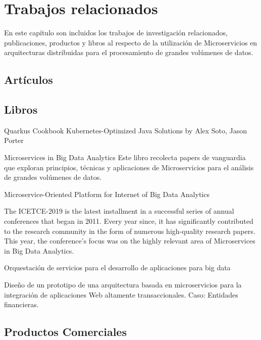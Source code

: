 \chapter{Trabajos relacionados}

En este capítulo son incluidos  los trabajos de investigación relacionados, publicaciones, productos y libros al respecto de la utilización de Microservicios en arquitecturas distribuidas para el procesamiento de grandes volúmenes de datos.

\section{Artículos}








\section{Libros}

Quarkus Cookbook Kubernetes-Optimized Java Solutions by Alex Soto, Jason Porter

\par


Microservices in Big Data Analytics
Este libro recolecta papers de vanguardia que exploran principios, técnicas y aplicaciones de Microservicios para el análisis de grandes volúmenes de datos.
\par

Microservice-Oriented Platform for Internet of Big Data Analytics
\cite{3084568720190306}

\par
The ICETCE-2019 is the latest installment in a successful series of annual conferences that began in 2011. Every year since, it has significantly contributed to the research community in the form of numerous high-quality research papers. This year, the conference’s focus was on the highly relevant area of Microservices in Big Data Analytics.
\par
Orquestación de servicios para el desarrollo de aplicaciones para big data
\par
Diseño de un prototipo de una arquitectura basada en microservicios para la integración de aplicaciones Web altamente transaccionales. Caso: Entidades financieras.



\section{Productos Comerciales}